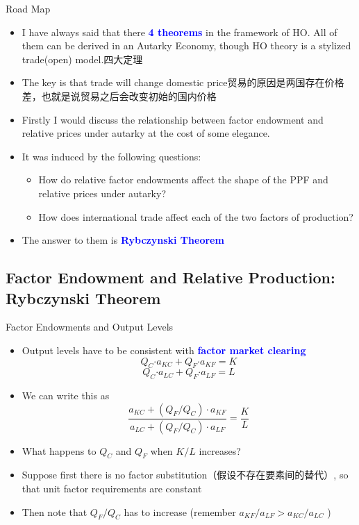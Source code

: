 \documentclass[10pt,hyperref={CJKbookmarks=true},xcolor=dvipsnames,aspectratio=169]{beamer}
\begin{document}
\begin{frame}{Road Map }

\begin{itemize}
\item I have always said that there \textbf{\textcolor{blue}{4 theorems}}
in the framework of HO. All of them can be derived in an Autarky Economy,
though HO theory is a stylized trade(open) model.四大定理
\item The key is that trade will change domestic price贸易的原因是两国存在价格差，也就是说贸易之后会改变初始的国内价格
\item Firstly I would discuss the relationship between factor endowment
and relative prices under autarky at the cost of some elegance.
\item It was induced by the following questions:

\begin{itemize}
\item How do relative factor endowments affect the shape of the PPF and
relative prices under autarky? 
\item How does international trade affect each of the two factors of production? 
\end{itemize}
\item The answer to them is \textbf{\textcolor{blue}{Rybczynski Theorem}}
\end{itemize}
\end{frame}



\subsection{Factor Endowment and Relative Production: Rybczynski Theorem}
\begin{frame}{Factor Endowments and Output Levels }

\begin{itemize}
\item Output levels have to be consistent with \textbf{\textcolor{blue}{factor
market clearing}}
\[
Q_{C}\text{·}a_{KC}+Q_{F}\text{·}a_{KF}=K
\]
\[
Q_{C}\text{·}a_{LC}+Q_{F}\text{·}a_{LF}=L
\]

\item We can write this as 
\[
\frac{a_{KC}+\left(Q_{F}/Q_{C}\right)\cdot a_{KF}}{a_{LC}+\left(Q_{F}/Q_{C}\right)\cdot a_{LF}}=\frac{K}{L}
\]

\item What happens to $Q_{C}$ and $Q_{F}$ when $K/L$ increases?
\item Suppose first there is no factor substitution（假设不存在要素间的替代）, so that unit factor
requirements are constant  
\item Then note that $Q_{F}/Q_{C}$ has to increase (remember $a_{KF}/a_{LF}>a_{KC}/a_{LC}$
) 
\end{itemize}
\end{frame}
\end{document}
